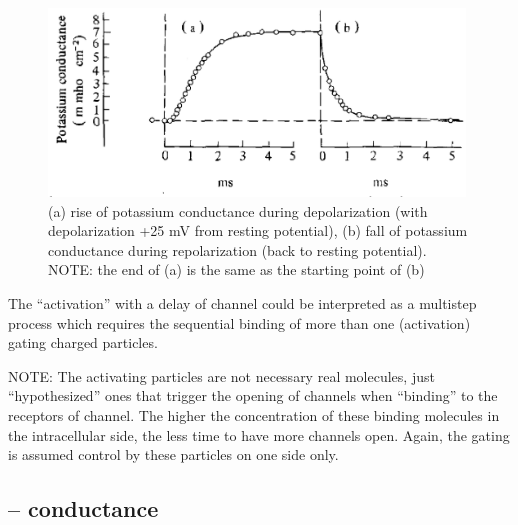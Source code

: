 \begin{figure}[htb]
  \centerline{\includegraphics[height=5cm]{./images/g_K.eps}}
  \caption{(a) rise of potassium conductance during depolarization
    (with depolarization +25 mV from resting potential), (b) fall of potassium
    conductance during repolarization (back to resting potential).
    NOTE: the end of (a) is the same as the starting point of
    (b)}\label{fig:g_K}
\end{figure}

The ``activation'' with a delay of  channel could be
interpreted as a multistep process which requires the sequential binding of
more than one (activation) gating charged particles.


NOTE: The activating particles are not necessary real molecules, just
``hypothesized'' ones that trigger the opening of  channels when
``binding'' to the receptors of  channel.  The higher the concentration
of these binding molecules in the intracellular side, the less time to have more
channels open. Again, the gating is assumed control by these particles on one
side only.


\subsection{-- conductance}
\label{sec:conductance-K+-current-HH}

